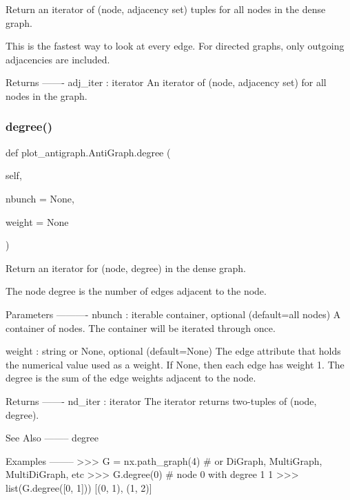 \begin{DoxyVerb}Return an iterator of (node, adjacency set) tuples for all nodes
   in the dense graph.

This is the fastest way to look at every edge.
For directed graphs, only outgoing adjacencies are included.

Returns
-------
adj_iter : iterator
   An iterator of (node, adjacency set) for all nodes in
   the graph.
\end{DoxyVerb}
 \mbox{\label{classplot__antigraph_1_1AntiGraph_a90ae3cf25b4191c16636e611ecb6af42}} 
\subsubsection{\texorpdfstring{degree()}{degree()}}
{\footnotesize\ttfamily def plot\+\_\+antigraph.\+Anti\+Graph.\+degree (\begin{DoxyParamCaption}\item[{}]{self,  }\item[{}]{nbunch = {\ttfamily None},  }\item[{}]{weight = {\ttfamily None} }\end{DoxyParamCaption})}

\begin{DoxyVerb}Return an iterator for (node, degree) in the dense graph.

The node degree is the number of edges adjacent to the node.

Parameters
----------
nbunch : iterable container, optional (default=all nodes)
    A container of nodes.  The container will be iterated
    through once.

weight : string or None, optional (default=None)
   The edge attribute that holds the numerical value used
   as a weight.  If None, then each edge has weight 1.
   The degree is the sum of the edge weights adjacent to the node.

Returns
-------
nd_iter : iterator
    The iterator returns two-tuples of (node, degree).

See Also
--------
degree

Examples
--------
>>> G = nx.path_graph(4)  # or DiGraph, MultiGraph, MultiDiGraph, etc
>>> G.degree(0)  # node 0 with degree 1
1
>>> list(G.degree([0, 1]))
[(0, 1), (1, 2)]\end{DoxyVerb}
 \mbox{\label{classplot__antigraph_1_1AntiGraph_a814d549889d36f333211967793b88229}} 
